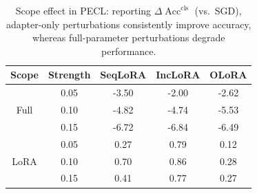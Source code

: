 \documentclass[10pt]{article} %
\begin{document}
{%
\setlength{\textfloatsep}{0pt}      %
\setlength{\intextsep}{1pt}         %
\setlength{\floatsep}{1pt}          %
\setlength{\abovecaptionskip}{2pt}  %
\setlength{\belowcaptionskip}{8pt}  %
\captionsetup{skip=4pt}           %
\begin{table}[t]
\vspace{-5pt}
\centering
\caption{Scope effect in PECL: reporting $\Delta\operatorname{Acc}^{\mathrm{cls}}$ (vs.\ SGD), adapter-only perturbations consistently improve accuracy, whereas full-parameter perturbations degrade performance.}
\label{tab:lora_or_full_cls—show}
\footnotesize
\setlength{\tabcolsep}{3pt}
\renewcommand{\arraystretch}{0.88}
\begin{tabular}{@{}c c c c c@{}}
\toprule
\textbf{Scope} & \textbf{Strength} & \textbf{SeqLoRA} & \textbf{IncLoRA} & \textbf{OLoRA} \\
\midrule
\multirow{3}{*}{Full}
 & 0.05 & -3.50 & -2.00 & -2.62 \\
 & 0.10 & -4.82 & -4.74 & -5.53 \\
 & 0.15 & -6.72 & -6.84 & -6.49 \\
\midrule
\multirow{3}{*}{LoRA}
 & 0.05 & 0.27 & 0.79 & 0.12 \\
 & 0.10 & 0.70 & 0.86 & 0.28 \\
 & 0.15 & 0.41 & 0.77 & 0.27 \\
\bottomrule
\end{tabular}
\end{table}
\vspace{-5pt}
}%
\end{document}
